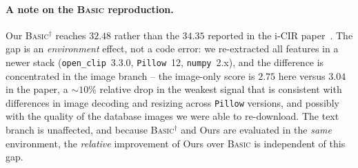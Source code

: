 \paragraph{A note on the \textsc{Basic} reproduction.}
Our \textsc{Basic}$^\dagger$ reaches $32.48$ rather than the $34.35$ reported in
the i-CIR paper~\cite{psomas2025icir}. The gap is an \emph{environment} effect,
not a code error: we re-extracted all features in a newer stack
(\texttt{open\_clip}~3.3.0, \texttt{Pillow}~12, \texttt{numpy}~2.x), and the
difference is concentrated in the image branch -- the image-only score is $2.75$
here versus $3.04$ in the paper, a $\sim\!10\%$ relative drop in the weakest
signal that is consistent with differences in image decoding and resizing across
\texttt{Pillow} versions, and possibly with the quality of the database images we
were able to re-download. The text branch is unaffected, and because
\textsc{Basic}$^\dagger$ and Ours are evaluated in the \emph{same} environment,
the \emph{relative} improvement of Ours over \textsc{Basic} is independent of
this gap.

